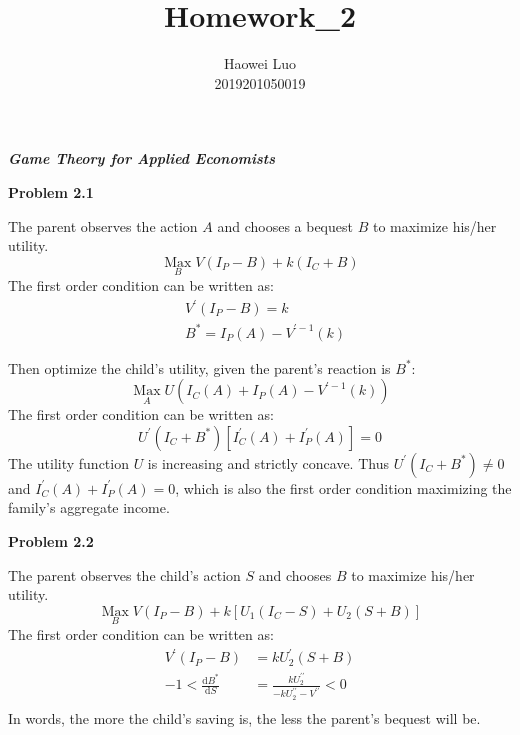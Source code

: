 \documentclass{article}
\title{\textbf{Homework\_2}}
\author{Haowei Luo\\2019201050019}
\begin{document}
    \maketitle
    \noindent\Large{\textit{\textbf{{Game Theory for Applied Economists}}}
    
    \noindent\Large{\textbf{{Problem 2.1}}
    
    The parent observes the action $A$ and chooses a bequest $B$ to maximize his/her utility.
    \begin{equation*}
        \mathop{Max} \limits_B V(I_P-B)+k(I_C+B)
    \end{equation*}
    The first order condition can be written as:
    \begin{align*}
        &V^\prime(I_P-B)=k\\
        &B^*=I_P(A)-V^{\prime-1}(k)
    \end{align*}
    
    Then optimize the child's utility, given the parent's reaction is $B^*$:
    \begin{equation*}
        \mathop{Max} \limits_A U(I_C(A)+I_P(A)-V^{\prime-1}(k))
    \end{equation*}
    The first order condition can be written as:
    \begin{equation*}
        U^{\prime}(I_C+B^*)[I_C^{\prime}(A)+I_P^{\prime}(A)]=0
    \end{equation*}
    The utility function $U$ is increasing and strictly concave. Thus $U^{\prime}(I_C+B^*) \neq 0$ and $I_C^{\prime}(A)+I_P^{\prime}(A)=0$, which is also the first order condition maximizing the family's aggregate income.

    \noindent\Large{\textbf{{Problem 2.2}}

    The parent observes the child's action $S$ and chooses $B$ to maximize his/her utility.
    \begin{equation*}
        \mathop{Max} \limits_B V(I_P-B)+k[U_1(I_C-S)+U_2(S+B)]
    \end{equation*}
    The first order condition can be written as:
    \begin{align*}
        V^\prime(I_P-B)&=kU_2^\prime (S+B)\\
        -1<\frac{\mathrm{d} B^*}{\mathrm{d} S}&=\frac{kU_2^{\prime\prime}}{-kU_2^{\prime\prime}-V^{\prime \prime}}<0\\
    \end{align*}
    In words, the more the child's saving is, the less the parent's bequest will be.

}}}
\end{document}
